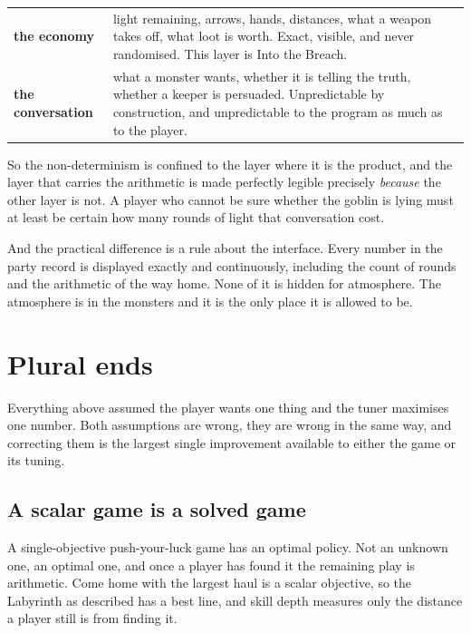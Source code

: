 \documentclass[11pt,a4paper]{article}
\begin{document}
\begin{center}
\begin{tabular}{@{}l@{\hspace{5mm}}>{\raggedright\arraybackslash}p{}@{}}
\toprule
\textbf{the economy} & light remaining, arrows, hands, distances, what a weapon takes off, what
loot is worth. Exact, visible, and never randomised. This layer is Into the Breach. \\[1mm]
\textbf{the conversation} & what a monster wants, whether it is telling the truth, whether a
keeper is persuaded. Unpredictable by construction, and unpredictable to the program as much as
to the player. \\
\bottomrule
\end{tabular}
\end{center}

So the non-determinism is confined to the layer where it is the product, and the layer that
carries the arithmetic is made perfectly legible precisely \emph{because} the other layer is
not. A player who cannot be sure whether the goblin is lying must at least be certain how many
rounds of light that conversation cost.

\begin{sectionbox}
And the practical difference is a rule about the interface. Every number in the party record is
displayed exactly and continuously, including the count of rounds and the arithmetic of the way
home. None of it is hidden for atmosphere. The atmosphere is in the monsters and it is the only
place it is allowed to be.
\end{sectionbox}

\section{Plural ends}
\label{sec:plural}

Everything above assumed the player wants one thing and the tuner maximises one number. Both
assumptions are wrong, they are wrong in the same way, and correcting them is the largest single
improvement available to either the game or its tuning.

\subsection{A scalar game is a solved game}

A single-objective push-your-luck game has an optimal policy. Not an unknown one, an optimal one,
and once a player has found it the remaining play is arithmetic. Come home with the largest haul
is a scalar objective, so the Labyrinth as described has a best line, and skill depth measures
only the distance a player still is from finding it.
\end{document}
